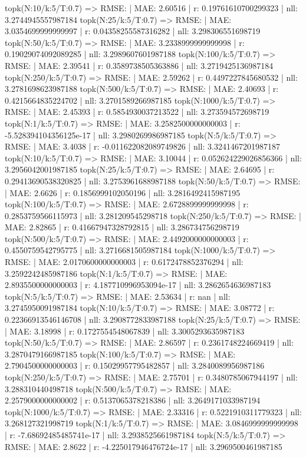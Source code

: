 topk(N:10/k:5/T:0.7) => RMSE: | MAE: 2.60516 | r: 0.19761610700299323 | nll: 3.2744945557987184
topk(N:25/k:5/T:0.7) => RMSE: | MAE: 3.0354699999999997 | r: 0.04358255587316282 | nll: 3.298306551698719
topk(N:50/k:5/T:0.7) => RMSE: | MAE: 3.2338999999999998 | r: 0.19029074092089285 | nll: 3.2989607601987188
topk(N:100/k:5/T:0.7) => RMSE: | MAE: 2.39541 | r: 0.3589738505363886 | nll: 3.2719425136987184
topk(N:250/k:5/T:0.7) => RMSE: | MAE: 2.59262 | r: 0.4497227845680532 | nll: 3.2781698623987188
topk(N:500/k:5/T:0.7) => RMSE: | MAE: 2.40693 | r: 0.4215664835224702 | nll: 3.2701589266987185
topk(N:1000/k:5/T:0.7) => RMSE: | MAE: 2.45393 | r: 0.5854930037213522 | nll: 3.273594572698719
topk(N:1/k:5/T:0.7) => RMSE: | MAE: 3.2582500000000003 | r: -5.528394104356125e-17 | nll: 3.2980269986987185
topk(N:5/k:5/T:0.7) => RMSE: | MAE: 3.4038 | r: -0.011622082089749826 | nll: 3.3241467201987187
topk(N:10/k:5/T:0.7) => RMSE: | MAE: 3.10044 | r: 0.052624229026856366 | nll: 3.2956042001987185
topk(N:25/k:5/T:0.7) => RMSE: | MAE: 2.64695 | r: 0.29413690538320825 | nll: 3.2753961688987188
topk(N:50/k:5/T:0.7) => RMSE: | MAE: 2.6626 | r: 0.1856999102050196 | nll: 3.2816492415987195
topk(N:100/k:5/T:0.7) => RMSE: | MAE: 2.6728899999999998 | r: 0.2853759566115973 | nll: 3.281209545298718
topk(N:250/k:5/T:0.7) => RMSE: | MAE: 2.82865 | r: 0.41667947328792815 | nll: 3.286734756298719
topk(N:500/k:5/T:0.7) => RMSE: | MAE: 2.4492000000000003 | r: 0.4550759542795775 | nll: 3.2716681505987184
topk(N:1000/k:5/T:0.7) => RMSE: | MAE: 2.0170600000000003 | r: 0.6172478852376294 | nll: 3.2592242485987186
topk(N:1/k:5/T:0.7) => RMSE: | MAE: 2.8935500000000003 | r: 4.187710996953094e-17 | nll: 3.2862654636987183
topk(N:5/k:5/T:0.7) => RMSE: | MAE: 2.53634 | r: nan | nll: 3.2745950091987184
topk(N:10/k:5/T:0.7) => RMSE: | MAE: 3.08772 | r: 0.22366913546146708 | nll: 3.2908772833987188
topk(N:25/k:5/T:0.7) => RMSE: | MAE: 3.18998 | r: 0.1727554548067839 | nll: 3.3005293635987183
topk(N:50/k:5/T:0.7) => RMSE: | MAE: 2.86597 | r: 0.2361748224669419 | nll: 3.2870479166987185
topk(N:100/k:5/T:0.7) => RMSE: | MAE: 2.7904500000000003 | r: 0.15029957795482857 | nll: 3.2840089956987186
topk(N:250/k:5/T:0.7) => RMSE: | MAE: 2.75701 | r: 0.3480785067944197 | nll: 3.288310440498718
topk(N:500/k:5/T:0.7) => RMSE: | MAE: 2.2579000000000002 | r: 0.5137065378218386 | nll: 3.2649171033987194
topk(N:1000/k:5/T:0.7) => RMSE: | MAE: 2.33316 | r: 0.5221910311779323 | nll: 3.268127321998719
topk(N:1/k:5/T:0.7) => RMSE: | MAE: 3.0846999999999998 | r: -7.68692485485741e-17 | nll: 3.2938525661987184
topk(N:5/k:5/T:0.7) => RMSE: | MAE: 2.8622 | r: -4.225017946476724e-17 | nll: 3.2969500461987185
